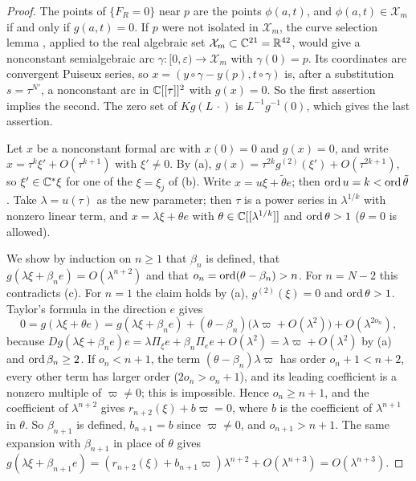 \begin{proof}
The points of $\{F_R=0\}$ near $p$ are the points $\phi(a,t)$, and $\phi(a,t)\in\mathcal X_m$ if
and only if $g(a,t)=0$.  If $p$ were not isolated in $\mathcal X_m$, the curve selection lemma
\cite[Thm.~2.5.5]{BCR}, applied to the real algebraic set $\mathcal X_m\subset\mathbb{C}^{21}=\mathbb{R}^{42}$,
would give a nonconstant semialgebraic arc $\gamma\colon[0,\varepsilon)\to\mathcal X_m$ with
$\gamma(0)=p$.  Its
coordinates are convergent Puiseux series, so $x=(y\circ\gamma-y(p),t\circ\gamma)$ is, after a
substitution $s=\tau^{N'}$, a nonconstant arc in $\mathbb{C}[[\tau]]^2$ with $g(x)=0$.  So the first
assertion implies the second.  The zero set of $Kg(L\,\cdot)$ is $L^{-1}g^{-1}(0)$, which gives
the last assertion.

Let $x$ be a nonconstant formal arc with $x(0)=0$ and $g(x)=0$, and write
$x=\tau^k\xi'+O(\tau^{k+1})$ with $\xi'\ne0$.  By (a),
$g(x)=\tau^{2k}g^{(2)}(\xi')+O(\tau^{2k+1})$, so $\xi'\in\mathbb{C}^*\xi$ for one of the $\xi=\xi_j$
of (b).  Write $x=u\xi+\tilde\theta e$; then $\operatorname{ord} u=k<\operatorname{ord}\tilde\theta$.  Take $\lambda=u(\tau)$ as
the new parameter; then $\tau$ is a power series in $\lambda^{1/k}$ with nonzero linear term,
and $x=\lambda\xi+\theta e$ with $\theta\in\mathbb{C}[[\lambda^{1/k}]]$ and $\operatorname{ord}\theta>1$ ($\theta=0$ is
allowed).

We show by induction on $n\ge1$ that $\beta_n$ is defined, that
$g(\lambda\xi+\beta_ne)=O(\lambda^{n+2})$ and that $o_n=\operatorname{ord}(\theta-\beta_n)>n$.  For $n=N-2$
this contradicts (c).  For $n=1$ the claim holds by (a), $g^{(2)}(\xi)=0$ and $\operatorname{ord}\theta>1$.
Taylor's formula in the direction $e$ gives
\[
  0=g(\lambda\xi+\theta e)
   =g(\lambda\xi+\beta_ne)+(\theta-\beta_n)\bigl(\lambda\varpi+O(\lambda^2)\bigr)
    +O(\lambda^{2o_n}),
\]
because $Dg(\lambda\xi+\beta_ne)e=\lambda\Pi_\xi e+\beta_n\Pi_ee+O(\lambda^2)
=\lambda\varpi+O(\lambda^2)$ by (a) and $\operatorname{ord}\beta_n\ge2$.  If $o_n<n+1$, the term
$(\theta-\beta_n)\lambda\varpi$ has order $o_n+1<n+2$, every other term has larger order
($2o_n>o_n+1$), and its leading coefficient is a nonzero multiple of $\varpi\ne0$; this is
impossible.  Hence $o_n\ge n+1$, and the coefficient of $\lambda^{n+2}$ gives
$r_{n+2}(\xi)+b\varpi=0$, where $b$ is the coefficient of $\lambda^{n+1}$ in $\theta$.  So
$\beta_{n+1}$ is defined, $b_{n+1}=b$ since $\varpi\ne0$, and $o_{n+1}>n+1$.  The same expansion
with $\beta_{n+1}$ in place of $\theta$ gives
$g(\lambda\xi+\beta_{n+1}e)=(r_{n+2}(\xi)+b_{n+1}\varpi)\lambda^{n+2}+O(\lambda^{n+3})
=O(\lambda^{n+3})$.
\end{proof}

